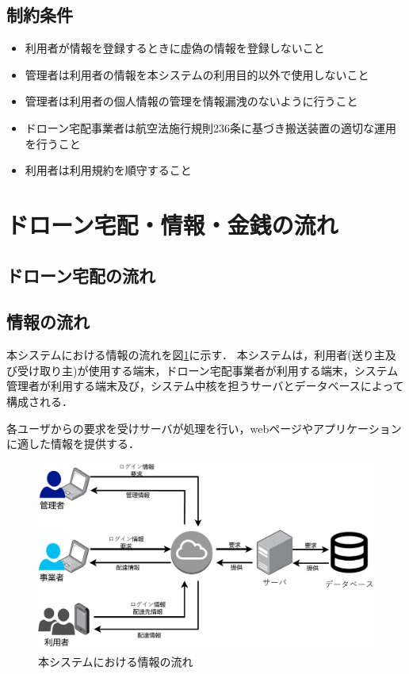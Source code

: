 \documentclass[a4paper, titlepage]{jsarticle}
\begin{document}
\subsection{制約条件}
\begin{itemize}
	\item 利用者が情報を登録するときに虚偽の情報を登録しないこと
	\item 管理者は利用者の情報を本システムの利用目的以外で使用しないこと
	\item 管理者は利用者の個人情報の管理を情報漏洩のないように行うこと
	\item ドローン宅配事業者は航空法施行規則236条に基づき搬送装置の適切な運用を行うこと
	\item 利用者は利用規約を順守すること
\end{itemize}
\section{ドローン宅配・情報・金銭の流れ}

\subsection{ドローン宅配の流れ}


\subsection{情報の流れ}
本システムにおける情報の流れを図\ref{fig:info_flow_1}に示す．
本システムは，利用者(送り主及び受け取り主)が使用する端末，ドローン宅配事業者が利用する端末，システム管理者が利用する端末及び，システム中核を担うサーバとデータベースによって構成される．

各ユーザからの要求を受けサーバが処理を行い，webページやアプリケーションに適した情報を提供する．

\begin{figure}[H]
  \centering
  \includegraphics[width=0.6\linewidth]{./info_flow.pdf}
  \caption{本システムにおける情報の流れ}
  \label{fig:info_flow_1}
\end{figure}
\end{document}
